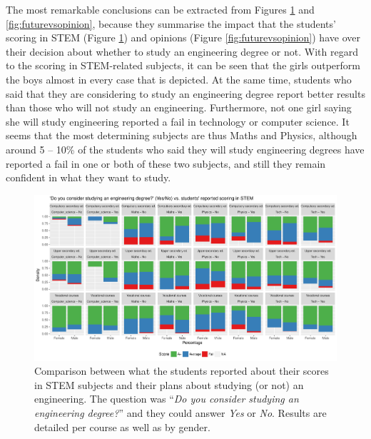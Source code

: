 \documentclass[journal,transmag]{IEEEtran}
\begin{document}
The most remarkable conclusions can be extracted from Figures \ref{fig:futurevsscore} and \ref{fig:futurevsopinion}, because they summarise the impact that the students' scoring in STEM (Figure \ref{fig:futurevsscore}) and opinions (Figure \ref{fig:futurevsopinion}) have over their decision about whether to study an engineering degree or not. With regard to the scoring in STEM-related subjects, it can be seen that the girls outperform the boys almost in every case that is depicted. At the same time, students who said that they are considering to study an engineering degree report better results than those who will not study an engineering. Furthermore, not one girl saying she will study engineering reported a fail in technology or computer science. It seems that the most determining subjects are thus Maths and Physics, although around 5 -- 10\% of the students who said they will study engineering degrees have reported a fail in one or both of these two subjects, and still they remain confident in what they want to study.

\begin{figure}
	\centering
	\includegraphics[width=1\textwidth]{img/future_vs_scoringSTEM.pdf}
	\caption{Comparison between what the students reported about their scores in STEM subjects and their plans about studying (or not) an engineering. The question was ``\textit{Do you consider studying an engineering degree?}'' and they could answer \textit{Yes} or \textit{No}. Results are detailed per course as well as by gender.}
	\label{fig:futurevsscore}
\end{figure}
\end{document}
